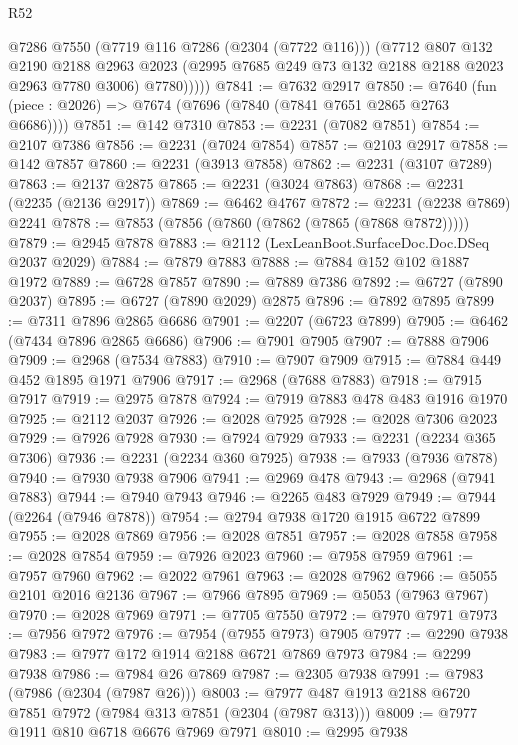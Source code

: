 \begin{lexlean}{R52}
\begin{coremodule}
            @7286
            @7550
            (@7719 @116 @7286 (@2304 (@7722 @116)))
            (@7712
              @807
              @132
              @2190
              @2188
              @2963
              @2023
              (@2995 @7685 @249 @73 @132 @2188 @2188 @2023 @2963 @7780 @3006)
              @7780)))))
@7841 := @7632 @2917
@7850 := @7640 (fun (piece : @2026) => @7674 (@7696 (@7840 (@7841 @7651 @2865 @2763 @6686))))
@7851 := @142 @7310
@7853 := @2231 (@7082 @7851)
@7854 := @2107 @7386
@7856 := @2231 (@7024 @7854)
@7857 := @2103 @2917
@7858 := @142 @7857
@7860 := @2231 (@3913 @7858)
@7862 := @2231 (@3107 @7289)
@7863 := @2137 @2875
@7865 := @2231 (@3024 @7863)
@7868 := @2231 (@2235 (@2136 @2917))
@7869 := @6462 @4767
@7872 := @2231 (@2238 @7869) @2241
@7878 := @7853 (@7856 (@7860 (@7862 (@7865 (@7868 @7872)))))
@7879 := @2945 @7878
@7883 := @2112 (LexLeanBoot.SurfaceDoc.Doc.DSeq @2037 @2029)
@7884 := @7879 @7883
@7888 := @7884 @152 @102 @1887 @1972
@7889 := @6728 @7857
@7890 := @7889 @7386
@7892 := @6727 (@7890 @2037)
@7895 := @6727 (@7890 @2029) @2875
@7896 := @7892 @7895
@7899 := @7311 @7896 @2865 @6686
@7901 := @2207 (@6723 @7899)
@7905 := @6462 (@7434 @7896 @2865 @6686)
@7906 := @7901 @7905
@7907 := @7888 @7906
@7909 := @2968 (@7534 @7883)
@7910 := @7907 @7909
@7915 := @7884 @449 @452 @1895 @1971 @7906
@7917 := @2968 (@7688 @7883)
@7918 := @7915 @7917
@7919 := @2975 @7878
@7924 := @7919 @7883 @478 @483 @1916 @1970
@7925 := @2112 @2037
@7926 := @2028 @7925
@7928 := @2028 @7306 @2023
@7929 := @7926 @7928
@7930 := @7924 @7929
@7933 := @2231 (@2234 @365 @7306)
@7936 := @2231 (@2234 @360 @7925)
@7938 := @7933 (@7936 @7878)
@7940 := @7930 @7938 @7906
@7941 := @2969 @478
@7943 := @2968 (@7941 @7883)
@7944 := @7940 @7943
@7946 := @2265 @483 @7929
@7949 := @7944 (@2264 (@7946 @7878))
@7954 := @2794 @7938 @1720 @1915 @6722 @7899
@7955 := @2028 @7869
@7956 := @2028 @7851
@7957 := @2028 @7858
@7958 := @2028 @7854
@7959 := @7926 @2023
@7960 := @7958 @7959
@7961 := @7957 @7960
@7962 := @2022 @7961
@7963 := @2028 @7962
@7966 := @5055 @2101 @2016 @2136
@7967 := @7966 @7895
@7969 := @5053 (@7963 @7967)
@7970 := @2028 @7969
@7971 := @7705 @7550
@7972 := @7970 @7971
@7973 := @7956 @7972
@7976 := @7954 (@7955 @7973) @7905
@7977 := @2290 @7938
@7983 := @7977 @172 @1914 @2188 @6721 @7869 @7973
@7984 := @2299 @7938
@7986 := @7984 @26 @7869
@7987 := @2305 @7938
@7991 := @7983 (@7986 (@2304 (@7987 @26)))
@8003 := @7977 @487 @1913 @2188 @6720 @7851 @7972 (@7984 @313 @7851 (@2304 (@7987 @313)))
@8009 := @7977 @1911 @810 @6718 @6676 @7969 @7971
@8010 := @2995 @7938

\end{coremodule}
\end{lexlean}
